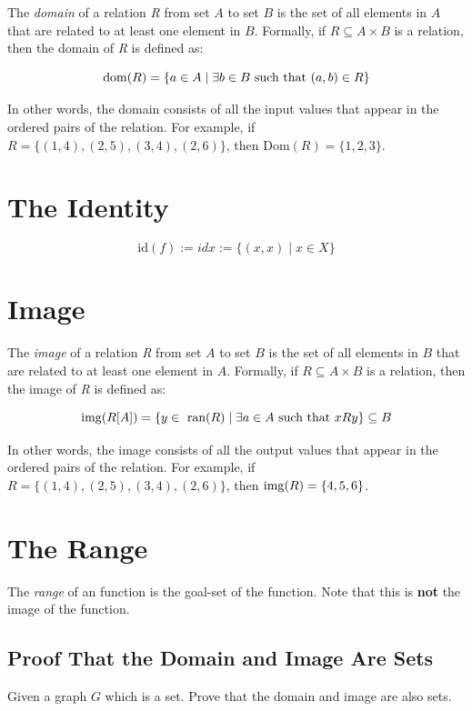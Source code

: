 The \emph{domain} of a relation \emph{R} from set \(A\) to set \(B\) is the set of all elements in
\(A\) that are related to at least one element in \(B\). Formally, if \(R \subseteq A \times B\)
is a relation, then the domain of \emph{R} is defined as:

\[
	\mathrm{dom}(R) = \{a \in A \mid \exists b \in B \text{ such that } (a,b) \in R\}
\]

In other words, the domain consists of all the input values that appear in the ordered pairs of the
relation. For example, if \(R = \{(1,4), (2,5), (3,4), (2,6)\}\), then \(\text{Dom}(R) = \{1, 2, 3\}\).

\section{The Identity}

\[
	\text{id}(f):= idx:= \{(x, x)\mid x \in X\}
\]

\section{Image}

The \emph{image} of a relation \emph{R} from set \(A\) to set \(B\) is the set
of all elements in \(B\) that are related to at least one element in \(A\). Formally, if
\(R \subseteq A \times B\) is a relation, then the image of \emph{R} is defined as:

\[
	\mathrm{img}(R[A]) = \{y \in \text{ ran}(R) \mid \exists a \in A \text{ such that } xRy\} \subseteq B
\]

In other words, the image consists of all the output values that appear in the ordered pairs of the
relation. For example, if \(R = \{(1,4), (2,5), (3,4), (2,6)\}\), then \(\mathrm{img}(R) = \{4, 5, 6\}\).

\section{The Range}

The \emph{range} of an function is the goal-set of the function. Note that this is \textbf{not} the image of the function.

\subsection{Proof That the Domain and Image Are Sets}

Given a graph \(G\) which is a set. Prove that the domain and image are also sets.

